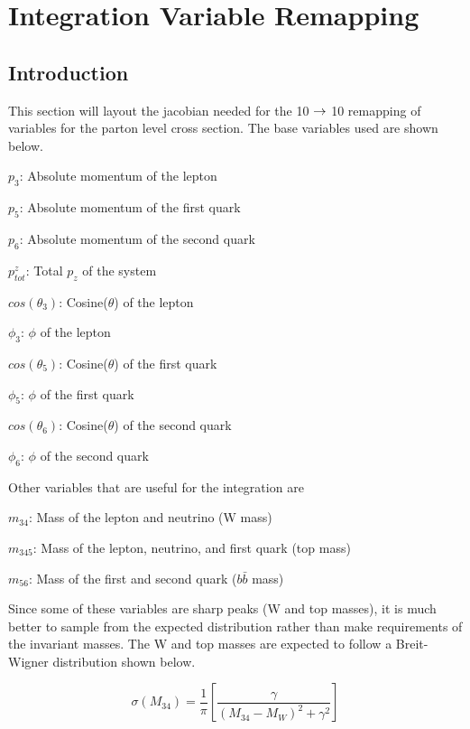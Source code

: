  \section{Integration Variable Remapping}

\subsection{Introduction}
This section will layout the jacobian needed for the 10 $\rightarrow$ 10 remapping of
variables for the parton level cross section. The base variables used are shown below.

\begin{myitemize}
\item $p_{3}$: Absolute momentum of the lepton
\item $p_{5}$: Absolute momentum of the first quark
\item $p_{6}$: Absolute momentum of the second quark
\item $p_{tot}^{z}$: Total $p_{z}$ of the system
\item $cos(\theta_{3})$: Cosine($\theta$) of the lepton
\item $\phi_{3}$: $\phi$ of the lepton
\item $cos(\theta_{5})$: Cosine($\theta$) of the first quark
\item $\phi_{5}$: $\phi$ of the first quark
\item $cos(\theta_{6})$: Cosine($\theta$) of the second quark
\item $\phi_{6}$: $\phi$ of the second quark
\end{myitemize}

Other variables that are useful for the integration are
\begin{myitemize}
\item $m_{34}$: Mass of the lepton and neutrino (W mass)
\item $m_{345}$: Mass of the lepton, neutrino, and first quark (top mass)
\item $m_{56}$: Mass of the first and second quark ($b\bar{b}$ mass)
\end{myitemize}

Since some of these variables are sharp peaks (W and top masses), it is much
better to sample from the expected distribution rather than make requirements of
the invariant masses. The W and top masses are expected to follow a Breit-Wigner
distribution shown below.

\begin{equation}
\sigma(M_{34}) = \frac{1}{\pi} \left[ \frac{\gamma}{(M_{34} - M_{W})^{2} +
\gamma^{2}} \right]
\end{equation}

